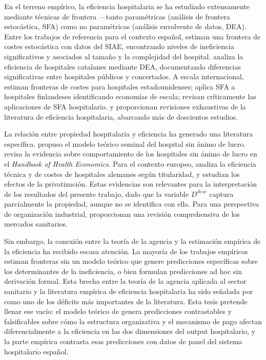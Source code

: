 \documentclass[12pt, a4paper, twoside, openright]{book}
\theoremstyle{plain}
\theoremstyle{definition}
\theoremstyle{remark}
\begin{document}
En el terreno empírico, la eficiencia hospitalaria se ha estudiado extensamente mediante técnicas de frontera ---tanto paramétricas (análisis de frontera estocástica, SFA) como no paramétricas (análisis envolvente de datos, DEA). Entre los trabajos de referencia para el contexto español, \citet{puigjunoy2000} estiman una frontera de costes estocástica con datos del SIAE, encontrando niveles de ineficiencia significativos y asociados al tamaño y la complejidad del hospital. \citet{prior2006} analiza la eficiencia de hospitales catalanes mediante DEA, documentando diferencias significativas entre hospitales públicos y concertados. A escala internacional, \citet{zuckerman1994} estiman fronteras de costes para hospitales estadounidenses; \citet{linna1998} aplica SFA a hospitales finlandeses identificando economías de escala; \citet{rosko2008} revisan críticamente las aplicaciones de SFA hospitalario. \citet{jacobs2006} y \citet{hollingsworth2008} proporcionan revisiones exhaustivas de la literatura de eficiencia hospitalaria, abarcando más de doscientos estudios.

La relación entre propiedad hospitalaria y eficiencia ha generado una literatura específica. \citet{newhouse1970} propuso el modelo teórico seminal del hospital sin ánimo de lucro. \citet{sloan2000} revisa la evidencia sobre comportamiento de los hospitales sin ánimo de lucro en el \textit{Handbook of Health Economics}. Para el contexto europeo, \citet{herr2011} analiza la eficiencia técnica y de costes de hospitales alemanes según titularidad, y \citet{tiemann2012} estudian los efectos de la privatización. Estas evidencias son relevantes para la interpretación de los resultados del presente trabajo, dado que la variable $D^{desc}$ captura parcialmente la propiedad, aunque no se identifica con ella. Para una perspectiva de organización industrial, \citet{gaynor2015} proporcionan una revisión comprehensiva de los mercados sanitarios.

Sin embargo, la conexión entre la teoría de la agencia y la estimación empírica de la eficiencia ha recibido escasa atención. La mayoría de los trabajos empíricos estiman fronteras sin un modelo teórico que genere predicciones específicas sobre los determinantes de la ineficiencia, o bien formulan predicciones ad hoc sin derivación formal. Esta brecha entre la teoría de la agencia aplicada al sector sanitario y la literatura empírica de eficiencia hospitalaria ha sido señalada por \citet{hollingsworth2008} como uno de los déficits más importantes de la literatura. Esta tesis pretende llenar ese vacío: el modelo teórico de \citet{izquierdo2019} genera predicciones contrastables y falsificables sobre cómo la estructura organizativa y el mecanismo de pago afectan diferencialmente a la eficiencia en las dos dimensiones del output hospitalario, y la parte empírica contrasta esas predicciones con datos de panel del sistema hospitalario español.
\end{document}
